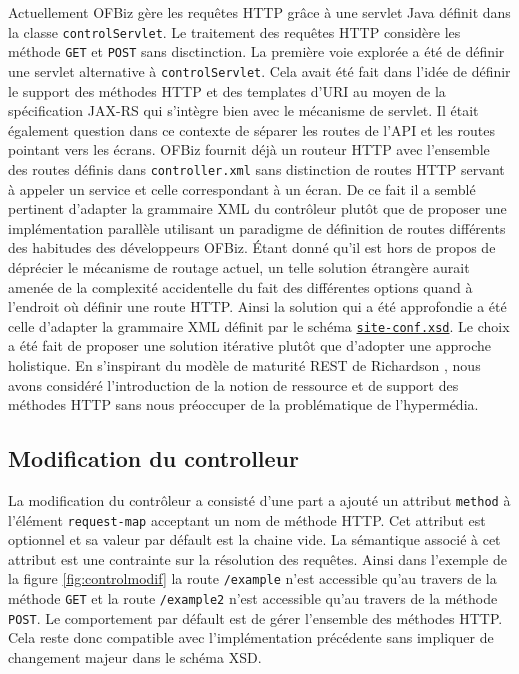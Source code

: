 \documentclass[a4paper, 11pt]{report}
\begin{document}
Actuellement OFBiz gère les requêtes HTTP grâce à une servlet Java
\cite{chan2017servlet} définit dans la classe \verb=controlServlet=.
Le traitement des requêtes HTTP considère les méthode \verb=GET= et
\verb=POST= sans disctinction. La première voie explorée a été de
définir une servlet alternative à \verb=controlServlet=. Cela avait
été fait dans l'idée de définir le support des méthodes HTTP et des
templates d'URI au moyen de la spécification JAX-RS qui s'intègre bien
avec le mécanisme de servlet. Il était également question dans ce
contexte de séparer les routes de l'API et les routes pointant vers
les écrans.  OFBiz fournit déjà un routeur HTTP avec l'ensemble des
routes définis dans \verb=controller.xml= sans distinction de routes
HTTP servant à appeler un service et celle correspondant à un
écran. De ce fait il a semblé pertinent d'adapter la grammaire XML du
contrôleur plutôt que de proposer une implémentation parallèle
utilisant un paradigme de définition de routes différents des
habitudes des développeurs OFBiz.  Étant donné qu'il est hors de
propos de déprécier le mécanisme de routage actuel, un telle solution
étrangère aurait amenée de la complexité accidentelle du fait des
différentes options quand à l'endroit où définir une route HTTP. Ainsi
la solution qui a été approfondie a été celle d'adapter la grammaire
XML définit par le schéma
\href{http://ofbiz.apache.org/dtds/site-conf.xsd}{\nolinkurl{site-conf.xsd}}. Le
choix a été fait de proposer une solution itérative plutôt que
d'adopter une approche holistique. En s'inspirant du modèle de
maturité REST de Richardson \cite{fowler2010richardson}, nous avons
considéré l'introduction de la notion de ressource et de support des
méthodes HTTP sans nous préoccuper de la problématique de
l'hypermédia.

\subsection{Modification du controlleur}

La modification du contrôleur a consisté d'une part a ajouté un
attribut \verb=method= à l'élément \verb=request-map= acceptant un nom
de méthode HTTP. Cet attribut est optionnel et sa valeur par défault
est la chaine vide. La sémantique associé à cet attribut est une
contrainte sur la résolution des requêtes. Ainsi dans l'exemple de la
figure \ref{fig:controlmodif} la route \verb=/example= n'est
accessible qu'au travers de la méthode \verb=GET= et la route
\verb=/example2= n'est accessible qu'au travers de la méthode
\verb=POST=. Le comportement par défault est de gérer l'ensemble des
méthodes HTTP. Cela reste donc compatible avec l'implémentation
précédente sans impliquer de changement majeur dans le schéma XSD.
\end{document}
